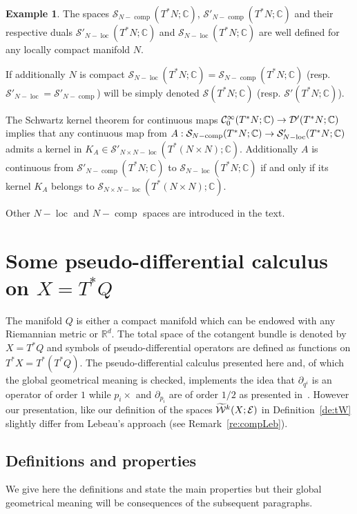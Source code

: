\documentclass[10pt]{amsart}
\theoremstyle{definition}\newtheorem{defi}[theo]{Definition}\newtheorem{rema}[theo]{Remark}\newtheorem{exam}[theo]{Example}\newtheorem{exem}[theo]{Example}\newtheorem{nota}[theo]{Notation}
\newcommand{\C}{\mathbb{C}}
\newcommand{\R}{\mathbb{R}}
\newcommand{\clW}{\mathcal{W}}
\newcommand{\clC}{\mathcal{C}}
\newcommand{\clE}{\mathcal{E}}
\newcommand{\clS}{\mathcal{S}}
\newcommand{\clD}{\mathcal{D}}
\DeclareMathOperator{\ccomp}{comp}
\DeclareMathOperator{\locc}{loc}
\let\oldtilde\tilde
\renewcommand*{\tilde}[1]{\mathchoice{\widetilde{#1}}{\widetilde{#1}}{\oldtilde{#1}}{\oldtilde{#1}}}
\renewcommand*{\to}{\mathchoice{\longrightarrow}{\rightarrow}{\rightarrow}{\rightarrow}}
\begin{document}
\begin{exam}
The spaces $\clS_{N-\ccomp}(T^{*}N;\C)$, $\clS'_{N-\ccomp}(T^{*}N;\C)$ and their respective duals $\clS'_{N-\locc}(T^{*}N;\C)$ and $\clS_{N-\locc}(T^{*}N;\C)$ are well defined for any locally compact manifold $N$.

If additionally $N$ is compact $\clS_{N-\locc}(T^{*}N;\C)=\clS_{N-\ccomp}(T^{*}N;\C)$ (resp. $\clS'_{N-\locc}=\clS'_{N-\ccomp}$) will be simply denoted $\clS(T^{*}N;\C)$ (resp. $\clS'(T^{*}N;\C)$).

The Schwartz kernel theorem for continuous maps $\clC^{\infty}_{0}(T^{*}N;\C)\to \clD'(T^{*}N;\C)$ implies that any continuous map from $A:\clS_{N-\ccomp}(T^{*}N;\C)\to \clS'_{N-\locc}(T^{*}N;\C)$ admits a kernel in $K_{A}\in \clS'_{N\times N-\locc}(T^{*}(N\times N);\C)$. Additionally $A$ is continuous from $\clS'_{N-\ccomp}(T^{*}N;\C)$ to $\clS_{N-\locc}(T^{*}N;\C)$ if and only if its kernel $K_{A}$ belongs to $\clS_{N\times N-\locc}(T^{*}(N\times N);\C)$.
\end{exam}

Other $N-\locc$ and $N-\ccomp$ spaces are introduced in the text.


\section{Some pseudo-differential calculus on \texorpdfstring{$X=T^{*}Q$}{X=T\^*Q}}\label{sec:pseudodiff}
The manifold $Q$ is either a compact manifold which can be endowed with any Riemannian metric or $\R^{d}$. The total space of the cotangent bundle is denoted by $X=T^{*}Q$ and symbols of pseudo-differential operators are defined as functions on $T^{*}X=T^{*}(T^{*}Q)$.
The pseudo-differential calculus presented here and, of which the global geometrical meaning is checked, implements the idea that $\partial_{q^{i}}$ is an operator of order $1$ while $p_{i}\times$ and $\partial_{p_{i}}$ are of order $1/2$ as presented in~\cite{Leb1,Leb2}. However our presentation, like our definition of the spaces $\tilde{\clW}^{k}(X;\clE)$ in Definition~\ref{de:tW} slightly differ from Lebeau's approach (see Remark~\ref{re:compLeb}).

\subsection{Definitions and properties}\label{sec:defpseudo}

We give here the definitions and state the main properties but their global geometrical meaning will be consequences of the subsequent paragraphs.
\end{document}

